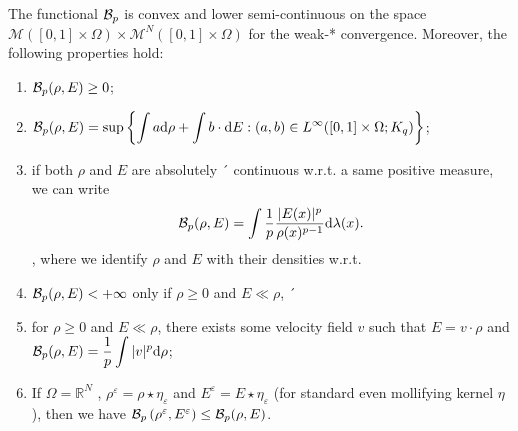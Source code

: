 \begin{proposition}
\label{proposition.properties_Bp}
	The functional $\mathcal{B}_p$ is convex and lower semi-continuous on the
	space $\mathcal{M}\left([0,1]\times\Omega\right) \times \mathcal{M}^N\left([0,1]\times\Omega\right)$ for the weak-* convergence. Moreover, the following properties
	hold:
	\begin{enumerate}
	\item $\mathcal{B}_p (\rho, E) \ge 0$;
	
	\item $\displaystyle \mathcal{B}_p(\rho, E) = \sup\left\{ \int a{\rm d} \rho + \int b\cdot {\rm d} E: (a,b) \in L^{\infty}([0,1]\times \Omega; K_q) \right\}$;
	\item if both $\rho$ and $E$ are absolutely
	´ continuous w.r.t. a same positive measure, we can write 
	$$
	\mathcal{B}_p(\rho, E) = \int \frac{1}{p}\frac{|E(x)|^p}{\rho(x)^{p-1}}{\rm d} \lambda(x).
	$$, where we identify $\rho$ and $E$
	with their densities w.r.t. 
	
	\item $\mathcal{B}_p(\rho, E) < +\infty$ only if $\rho \ge 0$ and $E \ll \rho$,
	´
	\item for $\rho \ge 0$ and $E \ll \rho$, there exists some velocity field $v$ such that $E = v\cdot \rho$ and $\mathcal{B}_p(\rho, E) = \displaystyle \frac{1}{p}\int|v|^p{\rm d} \rho$;
	\item If $\Omega = \mathbb{R}^N$ , $\rho^{\varepsilon} = \rho \star \eta_{\varepsilon}$ and $E^{\varepsilon} = E\star \eta_{\varepsilon}$ (for standard even mollifying kernel
	$\eta$ ), then we have $\mathcal{B}_p\left(\rho^{\varepsilon}, E^{\varepsilon}\right) \le \mathcal{B}_p(\rho, E)$.
	\end{enumerate}
\end{proposition} 

